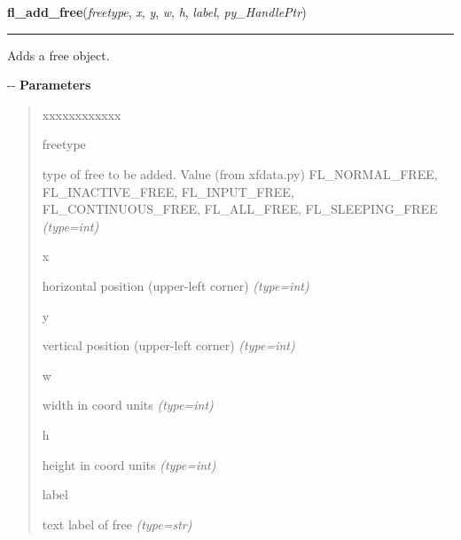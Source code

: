     \label{xformslib:flmisc:fl_add_free}

    \vspace{0.5ex}

\hspace{.8\funcindent}\begin{boxedminipage}{\funcwidth}

    \raggedright \textbf{fl\_add\_free}(\textit{freetype}, \textit{x}, \textit{y}, \textit{w}, \textit{h}, \textit{label}, \textit{py\_HandlePtr})

    \vspace{-1.5ex}

    \rule{\textwidth}{0.5\fboxrule}
\setlength{\parskip}{2ex}

Adds a free object.

-{}-
\setlength{\parskip}{1ex}
      \textbf{Parameters}
      \vspace{-1ex}

      \begin{quote}
        \begin{Ventry}{xxxxxxxxxxxx}

          \item[freetype]


type of free to be added. Value (from xfdata.py) FL\_NORMAL\_FREE,
FL\_INACTIVE\_FREE, FL\_INPUT\_FREE, FL\_CONTINUOUS\_FREE, FL\_ALL\_FREE,
FL\_SLEEPING\_FREE
            {\it (type=int)}

          \item[x]


horizontal position (upper-left corner)
            {\it (type=int)}

          \item[y]


vertical position (upper-left corner)
            {\it (type=int)}

          \item[w]


width in coord units
            {\it (type=int)}

          \item[h]


height in coord units
            {\it (type=int)}

          \item[label]


text label of free
            {\it (type=str)}


\end{Ventry}
\end{quote}
\end{boxedminipage}
